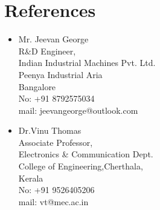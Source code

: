\documentclass[11pt,a4paper,sans]{moderncv}      	%
\begin{document}
			\section{References}
			\begin{cvcolumns}
			\cvcolumn{}
			{\begin{itemize}
				\item Mr. Jeevan George\\R\&D Engineer,\\Indian Industrial Machines Pvt. Ltd.\\Peenya Industrial Aria\\Bangalore\\No: +91 8792575034\\mail: jeevangeorge@outlook.com
			\end{itemize}
			}
			
			\cvcolumn{}
			{
			\begin{itemize}
				\item Dr.Vinu Thomas\\Associate Professor,\\Electronics \& Communication Dept.\\College of Engineering,Cherthala,\\Kerala\\No: +91 9526405206\\mail: vt@mec.ac.in  
			\end{itemize}
			}
					
			\end{cvcolumns}
		
					\nocite{*}
					
		
		
					\clearpage
					
\end{document}
